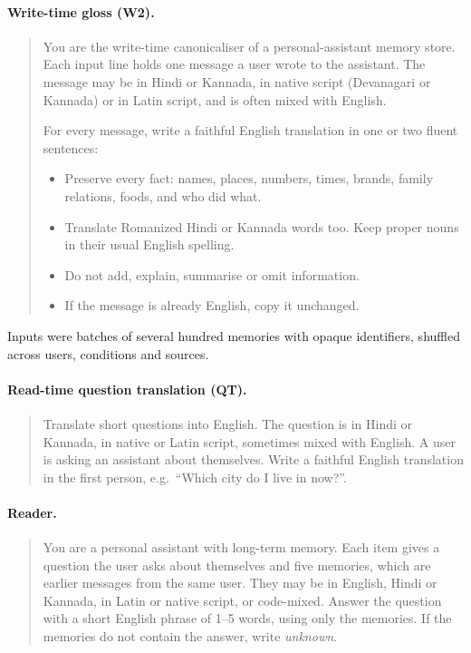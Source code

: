 \paragraph{Write-time gloss (W2).}
\begin{quote}\small
You are the write-time canonicaliser of a personal-assistant memory store. Each input line holds one message a user wrote to the assistant. The message may be in Hindi or Kannada, in native script (Devanagari or Kannada) or in Latin script, and is often mixed with English.

For every message, write a faithful English translation in one or two fluent sentences:
\begin{itemize}
\item Preserve every fact: names, places, numbers, times, brands, family relations, foods, and who did what.
\item Translate Romanized Hindi or Kannada words too. Keep proper nouns in their usual English spelling.
\item Do not add, explain, summarise or omit information.
\item If the message is already English, copy it unchanged.
\end{itemize}
\end{quote}
Inputs were batches of several hundred memories with opaque identifiers, shuffled across users, conditions and sources.

\paragraph{Read-time question translation (QT).}
\begin{quote}\small
Translate short questions into English. The question is in Hindi or Kannada, in native or Latin script, sometimes mixed with English. A user is asking an assistant about themselves. Write a faithful English translation in the first person, e.g.\ ``Which city do I live in now?''.
\end{quote}

\paragraph{Reader.}
\begin{quote}\small
You are a personal assistant with long-term memory. Each item gives a question the user asks about themselves and five memories, which are earlier messages from the same user. They may be in English, Hindi or Kannada, in Latin or native script, or code-mixed. Answer the question with a short English phrase of 1--5 words, using only the memories. If the memories do not contain the answer, write \emph{unknown}.
\end{quote}

